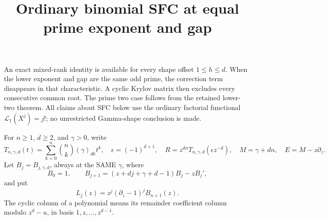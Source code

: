 \documentclass[11pt]{article}
\begin{document}
\setlength{\emergencystretch}{2em}
\title{Ordinary binomial SFC at equal prime exponent and gap}
\author{}\date{}\maketitle
An exact mixed-rank identity is available for every shape offset
$1\le h\le d$. When the lower exponent and gap are the same odd prime,
the correction term disappears in that characteristic. A cyclic
Krylov matrix then excludes every consecutive common root.
The prime two case follows from the retained lower-two theorem.
All claims about SFC below use the ordinary factorial functional
$\mathcal L_1(X^j)=j!$; no unrestricted Gamma-shape conclusion is made.

For $n\ge1$, $d\ge2$, and $\gamma>0$, write
\[
 T_{n,\gamma,d}(t)=\sum_{k=0}^n\binom nk(\gamma)_{dk}t^k,\quad
 \epsilon=(-1)^{d+1},\quad
 R=z^{dn}T_{n,\gamma,d}(\epsilon z^{-d}),\quad
 M=\gamma+dn,\quad E=M-z\partial_z.
\]
Let $B_j=B_{j,\gamma,d}$, always at the SAME $\gamma$, where
\[
 B_0=1,\qquad B_{j+1}=(z+dj+\gamma+d-1)B_j-zB_j',
\]
and put
\[
 L_j(z)=z^j(\partial_z-1)^jB_{n+1}(z).
\]
The cyclic column of a polynomial means its remainder coefficient
column modulo $z^d-u$, in basis $1,z,\ldots,z^{d-1}$.
\end{document}
